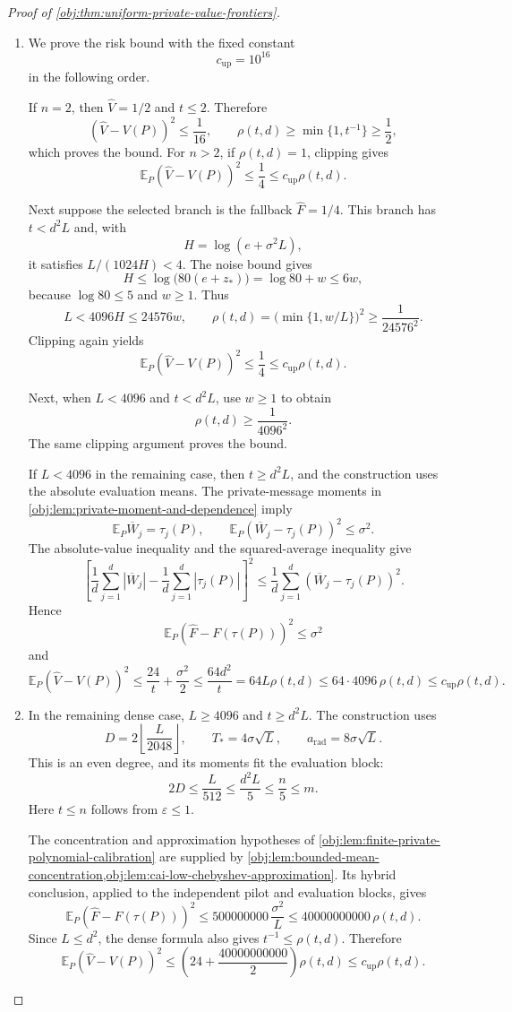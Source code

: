 \begin{proof}[Proof of \cref{obj:thm:uniform-private-value-frontiers}]
\begin{enumerate}
\item
We prove the risk bound with the fixed constant
\[
c_{\mathrm{up}}=10^{16}
\]
in the following order.

If \(n=2\), then \(\widehat V=1/2\) and \(t\le2\). Therefore
\[
(\widehat V-V(P))^2\le\frac1{16},
\qquad
\rho(t,d)\ge\min\{1,t^{-1}\}\ge\frac12,
\]
which proves the bound. For \(n>2\), if \(\rho(t,d)=1\), clipping gives
\[
\mathbb E_P(\widehat V-V(P))^2\le\frac14
\le c_{\mathrm{up}}\rho(t,d).
\]

Next suppose the selected branch is the fallback \(\widehat F=1/4\).
This branch has \(t<d^2L\) and, with
\[
H=\log(e+\sigma^2L),
\]
it satisfies \(L/(1024H)<4\). The noise bound gives
\[
H\le\log\!\bigl(80(e+z_*)\bigr)
=\log80+w\le6w,
\]
because \(\log80\le5\) and \(w\ge1\). Thus
\[
L<4096H\le24576w,
\qquad
\rho(t,d)=\bigl(\min\{1,w/L\}\bigr)^2
\ge\frac1{24576^2}.
\]
Clipping again yields
\[
\mathbb E_P(\widehat V-V(P))^2
\le\frac14
\le c_{\mathrm{up}}\rho(t,d).
\]

Next, when \(L<4096\) and \(t<d^2L\), use \(w\ge1\) to obtain
\[
\rho(t,d)\ge\frac1{4096^2}.
\]
The same clipping argument proves the bound.

If \(L<4096\) in the remaining case, then \(t\ge d^2L\), and the construction uses the absolute evaluation means. The private-message moments in
\cref{obj:lem:private-moment-and-dependence} imply
\[
\mathbb E_P\overline W_j=\tau_j(P),
\qquad
\mathbb E_P(\overline W_j-\tau_j(P))^2\le\sigma^2.
\]
The absolute-value inequality and the squared-average inequality give
\[
\left[
\frac1d\sum_{j=1}^d|\overline W_j|
-\frac1d\sum_{j=1}^d|\tau_j(P)|
\right]^2
\le\frac1d\sum_{j=1}^d
       (\overline W_j-\tau_j(P))^2.
\]
Hence
\[
\mathbb E_P(\widehat F-F(\tau(P)))^2\le\sigma^2
\]
and
\[
\mathbb E_P(\widehat V-V(P))^2
\le\frac{24}{t}+\frac{\sigma^2}{2}
\le\frac{64d^2}{t}
=64L\rho(t,d)
\le64\cdot4096\,\rho(t,d)
\le c_{\mathrm{up}}\rho(t,d).
\]

\item
In the remaining dense case, \(L\ge4096\) and \(t\ge d^2L\).
The construction uses
\[
D=2\left\lfloor\frac{L}{2048}\right\rfloor,
\qquad T_*=4\sigma\sqrt L,\qquad
a_{\mathrm{rad}}=8\sigma\sqrt L.
\]
This is an even degree, and its moments fit the evaluation block:
\[
2D\le\frac{L}{512}
\le\frac{d^2L}{5}
\le\frac n5\le m.
\]
Here \(t\le n\) follows from \(\varepsilon\le1\).

The concentration and approximation hypotheses of
\cref{obj:lem:finite-private-polynomial-calibration} are supplied by
\cref{obj:lem:bounded-mean-concentration,obj:lem:cai-low-chebyshev-approximation}.
Its hybrid conclusion, applied to the independent pilot and evaluation blocks, gives
\[
\mathbb E_P(\widehat F-F(\tau(P)))^2
\le500000000\,\frac{\sigma^2}{L}
\le40000000000\,\rho(t,d).
\]
Since \(L\le d^2\), the dense formula also gives \(t^{-1}\le\rho(t,d)\).
Therefore
\[
\mathbb E_P(\widehat V-V(P))^2
\le\left(24+\frac{40000000000}{2}\right)\rho(t,d)
\le c_{\mathrm{up}}\rho(t,d).
\]


\end{enumerate}
\end{proof}
